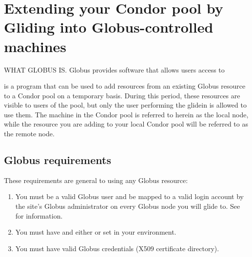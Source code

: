 \section{\label{sec:Glidein}Extending your Condor pool by Gliding into Globus-controlled machines}

WHAT GLOBUS IS.
Globus provides software that allows users access to 

 is a program that can be used to add resources from an
existing Globus resource to a Condor 
pool on a temporary basis. During this period, these resources are visible 
to users of the pool, but only the user performing the glidein is allowed 
to use them. The machine in the Condor pool is referred to herein as the
local node, while the resource you are adding to your local Condor pool
will be referred to as the remote node.

\subsection{Globus requirements}
These requirements are general to using any Globus resource:
\begin{enumerate}

\item You must be a valid Globus user and be mapped to a valid login account by
the site's Globus administrator on every Globus node you will glide to.
See  for information.

\item You must have  and either  or 
 set in your environment.

\item You must have valid Globus credentials (X509 certificate directory).


\end{enumerate}

